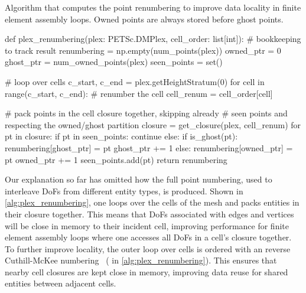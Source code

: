 \documentclass[thesis]{subfiles}
\begin{document}
\begin{algorithm}
  \caption{
    Algorithm that computes the point renumbering to improve data locality in finite element assembly loops.
    Owned points are always stored before ghost points.
  }

  \begin{center}
    \begin{minipage}{.9\textwidth}
      \begin{pyalg2}
        def plex_renumbering(plex: PETSc.DMPlex, cell_order: list[int]):
          # bookkeeping to track result
          renumbering = np.empty(num_points(plex))
          owned_ptr = 0
          ghost_ptr = num_owned_points(plex)
          seen_points = set()

          # loop over cells
          c_start, c_end = plex.getHeightStratum(0)
          for cell in range(c_start, c_end):
            # renumber the cell
            cell_renum = cell_order[cell]

            # pack points in the cell closure together, skipping already
            # seen points and respecting the owned/ghost partition
            closure = get_closure(plex, cell_renum)
            for pt in closure:
              if pt in seen_points:
                continue
              else:
                if is_ghost(pt):
                  renumbering[ghost_ptr] = pt
                  ghost_ptr += 1
                else:
                  renumbering[owned_ptr] = pt
                  owned_ptr += 1
                seen_points.add(pt)
          return renumbering
      \end{pyalg2}
    \end{minipage}
  \end{center}
  \label{alg:plex_renumbering}
\end{algorithm}

Our explanation so far has omitted how the full point numbering, used to interleave DoFs from different entity types, is produced.
Shown in \cref{alg:plex_renumbering}, one loops over the cells of the mesh and packs entities in their closure together.
This means that DoFs associated with edges and vertices will be close in memory to their incident cell, improving performance for finite element assembly loops where one accesses all DoFs in a cell's closure together.
To further improve locality, the outer loop over cells is ordered with an reverse Cuthill-McKee numbering~\cite{cuthillReducingBandwidthSparse1969} ( in \cref{alg:plex_renumbering}).
This ensures that nearby cell closures are kept close in memory, improving data reuse for shared entities between adjacent cells.
\end{document}
